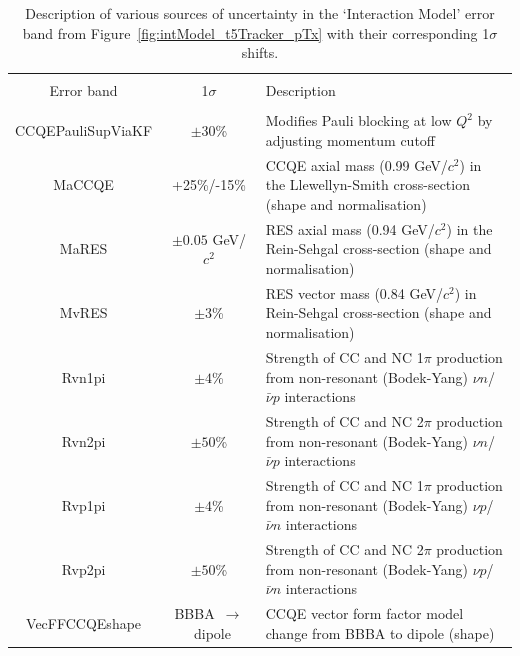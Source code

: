 \begin{table}[t!]
    \centering
    \small
    \begin{tabularx}{1.0\textwidth}{c c L}
    \hline \\ [-1.5 ex]
    Error band & 1$\sigma$ & Description\\ [0.5ex] %
    \hline
    \hline \\ [-2ex]
    CCQEPauliSupViaKF & $\pm30$\% & Modifies Pauli blocking at low $Q^2$ by adjusting momentum cutoff \\
    MaCCQE & +25\%/-15\% & CCQE axial mass (0.99 GeV/$c^2$) in the Llewellyn-Smith cross-section (shape and normalisation) \\
    MaRES & $\pm0.05$ GeV/$c^2$ & RES axial mass (0.94 GeV/$c^2$) in the Rein-Sehgal cross-section (shape and normalisation) \\
    MvRES & $\pm3$\% & RES vector mass (0.84 GeV/$c^2$) in Rein-Sehgal cross-section (shape and normalisation) \\
    Rvn1pi & $\pm4$\% & Strength of CC and NC 1$\pi$ production from non-resonant (Bodek-Yang) $\nu n$/$\bar{\nu}p$ interactions  \\
    Rvn2pi & $\pm50$\% & Strength of CC and NC 2$\pi$ production from non-resonant (Bodek-Yang) $\nu n$/$\bar{\nu}p$ interactions \\
    Rvp1pi & $\pm4$\% & Strength of CC and NC 1$\pi$ production from non-resonant (Bodek-Yang) $\nu p$/$\bar{\nu}n$ interactions \\
    Rvp2pi & $\pm50$\% & Strength of CC and NC 2$\pi$ production from non-resonant (Bodek-Yang) $\nu p$/$\bar{\nu}n$ interactions \\
    VecFFCCQEshape & BBBA~$\rightarrow$~dipole & CCQE vector form factor model change from BBBA to dipole (shape) \\
    \hline
    \end{tabularx}

    \caption{Description of various sources of uncertainty in the `Interaction Model' error band from Figure~\ref{fig:intModel_t5Tracker_pTx} with their corresponding 1$\sigma$ shifts.}
    \label{table:intModelUnc}
\end{table}

